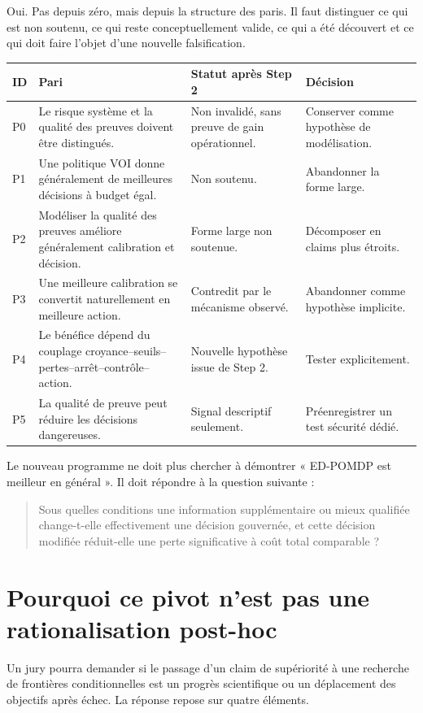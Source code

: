 \documentclass[11pt,a4paper]{article}
\begin{document}
Oui. Pas depuis zéro, mais depuis la structure des paris. Il faut distinguer ce qui est non soutenu, ce qui reste conceptuellement valide, ce qui a été découvert et ce qui doit faire l'objet d'une nouvelle falsification.

\begin{longtable}{p{}p{}p{}p{}}
\toprule
ID & Pari & Statut après Step 2 & Décision \\
\midrule
P0 & Le risque système et la qualité des preuves doivent être distingués. & Non invalidé, sans preuve de gain opérationnel. & Conserver comme hypothèse de modélisation. \\
P1 & Une politique VOI donne généralement de meilleures décisions à budget égal. & Non soutenu. & Abandonner la forme large. \\
P2 & Modéliser la qualité des preuves améliore généralement calibration et décision. & Forme large non soutenue. & Décomposer en claims plus étroits. \\
P3 & Une meilleure calibration se convertit naturellement en meilleure action. & Contredit par le mécanisme observé. & Abandonner comme hypothèse implicite. \\
P4 & Le bénéfice dépend du couplage croyance--seuils--pertes--arrêt--contrôle--action. & Nouvelle hypothèse issue de Step 2. & Tester explicitement. \\
P5 & La qualité de preuve peut réduire les décisions dangereuses. & Signal descriptif seulement. & Préenregistrer un test sécurité dédié. \\
\bottomrule
\end{longtable}

Le nouveau programme ne doit plus chercher à démontrer « ED-POMDP est meilleur en général ». Il doit répondre à la question suivante :

\begin{quote}
Sous quelles conditions une information supplémentaire ou mieux qualifiée change-t-elle effectivement une décision gouvernée, et cette décision modifiée réduit-elle une perte significative à coût total comparable ?
\end{quote}

\section{Pourquoi ce pivot n'est pas une rationalisation post-hoc}

Un jury pourra demander si le passage d'un claim de supériorité à une recherche de frontières conditionnelles est un progrès scientifique ou un déplacement des objectifs après échec. La réponse repose sur quatre éléments.
\end{document}

